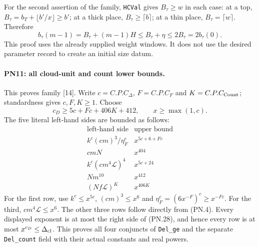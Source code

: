 \documentclass[11pt,a4paper]{article}
\numberwithin{equation}{section}
\theoremstyle{remark}\newtheorem{remark}[theorem]{Remark}
\begin{document}
For the second assertion of the family, \texttt{HCVal} gives
$B_\tau\geq w$ in each case: at a top,
$B_\tau=b_T+\lfloor b'/x\rfloor\geq b'$; at a thick place,
$B_\tau\geq\lceil b\rceil$; at a thin place,
$B_\tau=\lceil w\rceil$. Therefore
\[
 b_\tau(m-1)=B_\tau+(m-1)H
                \leq B_\tau+\eta\leq2B_\tau=2b_\tau(0).
                                                               \tag{PN.27}
\]
This proof uses the already supplied weight windows. It does not use
the desired parameter record to create an initial size datum.

\paragraph{PN11: all cloud-unit and count lower bounds.}
This proves family [14]. Write
$c=C.P.C_\Delta$, $F=C.P.C_F$ and $K=C.P.C_{\rm Count}$;
standardness gives $c,F,K\geq1$. Choose
\[
                 c_D\geq5c+Fc+406K+412,
                 \qquad x\geq\max(1,c).                    \tag{PN.28}
\]
The five literal left-hand sides are bounded as follows:
\[
\begin{array}{c|c}
 \text{left-hand side}&\text{upper bound}\\ \hline
 k^c(cm)^3/\eta_F^c&x^{5c+6+Fc}\\
 cmN&x^{404}\\
 k^c(cm^4\mathcal L)^4&x^{5c+24}\\
 Nm^{10}&x^{412}\\
 (Nf\mathcal L)^K&x^{406K}
\end{array}                                                   \tag{PN.29}
\]
For the first row, use $k^c\leq x^{5c}$,
$(cm)^3\leq x^6$ and
$\eta_F^c=(6x^{-F})^c\geq x^{-Fc}$.
For the third, $cm^4\mathcal L\leq x^6$.
The other three rows follow directly from (PN.4).
Every displayed exponent is at most the right side of (PN.28),
and hence every row is at most $x^{c_D}\leq\Delta_{\rm cl}$.
This proves all four conjuncts of \texttt{Del\_\allowbreak ge} and the separate
\texttt{Del\_\allowbreak count} field with their actual constants and real powers.
\end{document}
